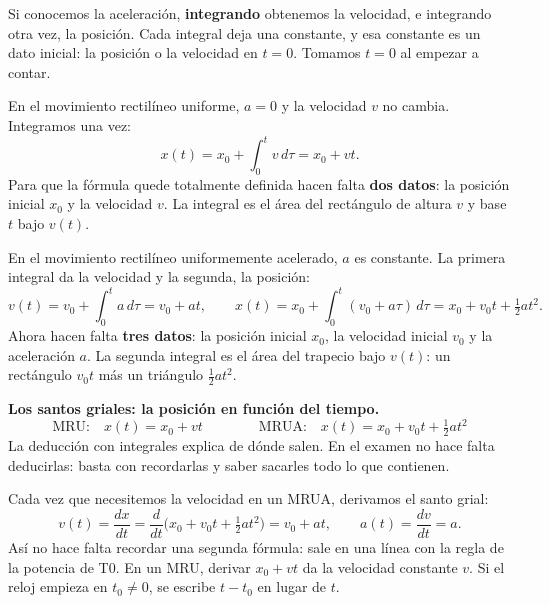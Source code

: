 \documentclass[11pt,a4paper]{article}
\begin{document}
Si conocemos la aceleraci\'on, \textbf{integrando} obtenemos la velocidad, e
integrando otra vez, la posici\'on. Cada integral deja una constante, y esa constante es
un dato inicial: la posici\'on o la velocidad en $t=0$. Tomamos $t=0$ al empezar a contar.

En el movimiento rectil\'ineo uniforme, $a=0$ y la velocidad $v$ no cambia. Integramos
una vez:
\[
x(t)=x_0+\int_0^t v\,d\tau=x_0+vt.
\]
Para que la f\'ormula quede totalmente definida hacen falta \textbf{dos datos}:
la posici\'on inicial $x_0$ y la velocidad $v$.
La integral es el \'area del rect\'angulo de altura $v$ y base $t$ bajo $v(t)$.

En el movimiento rectil\'ineo uniformemente acelerado, $a$ es constante. La primera integral
da la velocidad y la segunda, la posici\'on:
\[
v(t)=v_0+\int_0^t a\,d\tau=v_0+at,\qquad
x(t)=x_0+\int_0^t (v_0+a\tau)\,d\tau=x_0+v_0t+\tfrac12at^2.
\]
Ahora hacen falta \textbf{tres datos}: la posici\'on inicial $x_0$, la velocidad inicial $v_0$
y la aceleraci\'on $a$. La segunda integral es el \'area del trapecio bajo $v(t)$:
un rect\'angulo $v_0t$ m\'as un tri\'angulo $\tfrac12at^2$.

\begin{formulabox}
\textbf{Los santos griales: la posici\'on en funci\'on del tiempo.}
\[
\text{MRU:}\quad x(t)=x_0+vt
\qquad\qquad
\text{MRUA:}\quad x(t)=x_0+v_0t+\tfrac12at^2
\]
La deducci\'on con integrales explica de d\'onde salen. En el examen no hace falta
deducirlas: basta con recordarlas y saber sacarles todo lo que contienen.
\end{formulabox}

Cada vez que necesitemos la velocidad en un MRUA, derivamos el santo grial:
\[
v(t)=\frac{dx}{dt}=\frac{d}{dt}\Big(x_0+v_0t+\tfrac12at^2\Big)=v_0+at,
\qquad a(t)=\frac{dv}{dt}=a.
\]
As\'i no hace falta recordar una segunda f\'ormula: sale en una l\'inea con la regla de
la potencia de T0. En un MRU, derivar $x_0+vt$ da la velocidad constante $v$.
Si el reloj empieza en $t_0\ne0$, se escribe $t-t_0$ en lugar de $t$.
\end{document}
